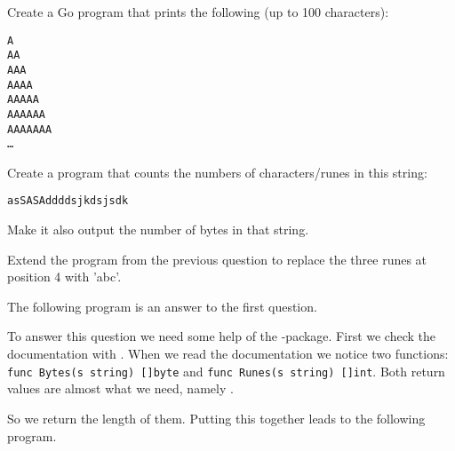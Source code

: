 \begin{Exercise}[title={Strings},difficulty=1]
\label{ex:strings}
\Question \label{ex:strings q1} Create a Go program that prints
the following (up to 100 characters):
\begin{alltt}
A
AA
AAA
AAAA
AAAAA
AAAAAA
AAAAAAA
\ldots
\end{alltt}


\Question \label{ex:strings q2} Create a program that counts
the numbers of characters/runes in this string:
\begin{alltt}
asSASA ddd dsjkdsjs dk
\end{alltt}
Make it also output the number of bytes in that string.

\Question \label{ex:string q3} Extend the program from
the previous question to replace the three runes at
position 4 with 'abc'.

\end{Exercise}

\begin{Answer}

\Question The following program is an answer to the first question.


\Question To answer this question we need some help of
the -package. First we check the documentation
with . When we read the documentation
we notice two functions: \lstinline{func Bytes(s string) []byte} and
\lstinline{func Runes(s string) []int}. Both return values are
almost what we need, namely . 

So we return the length of 
them. Putting this together leads to the following program.

\end{Answer}
